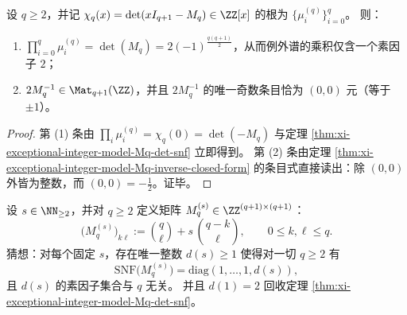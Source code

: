 \begin{corollary}\label{cor:xi-exceptional-integer-model-Mq-single-denominator-defect}
设 \(q\ge 2\)，并记 \(\chi_q(x)=\det(xI_{q+1}-M_q)\in\ZZ[x]\) 的根为 \(\{\mu_i^{(q)}\}_{i=0}^{q}\)。
则：
\begin{enumerate}
  \item \(\prod_{i=0}^{q}\mu_i^{(q)}=\det(M_q)=2(-1)^{\frac{q(q+1)}{2}}\)，从而例外谱的乘积仅含一个素因子 \(2\)；
  \item \(2M_q^{-1}\in\Mat_{q+1}(\ZZ)\)，并且 \(2M_q^{-1}\) 的唯一奇数条目恰为 \((0,0)\) 元（等于 \(\pm1\)）。
\end{enumerate}
\end{corollary}
\begin{proof}
第 (1) 条由 \(\prod_i\mu_i^{(q)}=\chi_q(0)=\det(-M_q)\) 与定理 \ref{thm:xi-exceptional-integer-model-Mq-det-snf} 立即得到。
第 (2) 条由定理 \ref{thm:xi-exceptional-integer-model-Mq-inverse-closed-form} 的条目式直接读出：除 \((0,0)\) 外皆为整数，而 \((0,0)=-\tfrac12\)。证毕。
\end{proof}

\begin{conjecture}[高阶加权互补核的单点分母现象普适]\label{conj:xi-exceptional-integer-model-weighted-snf-single-defect}
设 \(s\in\NN_{\ge 2}\)，并对 \(q\ge 2\) 定义矩阵 \(M_q^{(s)}\in\ZZ^{(q+1)\times(q+1)}\)：
\[
\bigl(M_q^{(s)}\bigr)_{k\ell}:=\binom{q}{\ell}+s\,\binom{q-k}{\ell},
\qquad 0\le k,\ell\le q.
\]
猜想：对每个固定 \(s\)，存在唯一整数 \(d(s)\ge 1\) 使得对一切 \(q\ge 2\) 有
\[
\mathrm{SNF}\bigl(M_q^{(s)}\bigr)=\mathrm{diag}(1,\dots,1,d(s)),
\]
且 \(d(s)\) 的素因子集合与 \(q\) 无关。
并且 \(d(1)=2\) 回收定理 \ref{thm:xi-exceptional-integer-model-Mq-det-snf}。
\end{conjecture}

